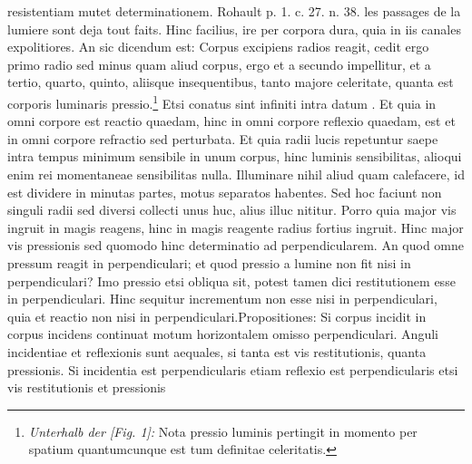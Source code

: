 resistentiam mutet determinationem. \pend \pstart Rohault\protect{} p. 1. c. 27. n. 38. les passages de la lumiere sont deja tout faits. Hinc facilius, ire per corpora dura, quia in iis canales expolitiores. An sic dicendum est: \pend \pstart Corpus excipiens radios reagit, cedit ergo primo radio sed minus quam aliud corpus, ergo et a secundo impellitur, et a tertio, quarto, quinto, aliisque insequentibus, tanto majore celeritate\protect{}, quanta est corporis luminaris pressio.\footnote{\textit{Unterhalb der [Fig. 1]:} Nota pressio luminis pertingit in momento per spatium quantumcunque est tum definitae celeritatis\protect{}. } Etsi conatus sint infiniti intra datum . Et quia in omni corpore est reactio quaedam, hinc in omni corpore reflexio\protect{} quaedam, est et in omni corpore refractio\protect{} sed perturbata. Et quia radii lucis repetuntur saepe intra tempus minimum sensibile in unum corpus, hinc luminis sensibilitas, alioqui enim rei momentaneae sensibilitas nulla. Illuminare nihil aliud quam calefacere, id est dividere in minutas partes, motus separatos habentes. Sed hoc faciunt non singuli radii sed diversi collecti unus huc, alius illuc nititur. \pend \pstart Porro quia major vis ingruit in magis reagens, hinc in magis reagente radius fortius ingruit. Hinc major vis pressionis sed quomodo hinc determinatio ad perpendicularem. An quod omne pressum reagit in perpendiculari; et quod pressio a lumine non fit nisi in perpendiculari? Imo pressio etsi obliqua sit, potest tamen dici restitutionem esse in perpendiculari. Hinc sequitur incrementum non esse nisi in perpendiculari, quia et reactio non nisi in perpendiculari.\pend \pstart Propositiones: Si corpus incidit in corpus  incidens continuat motum horizontalem omisso perpendiculari.  Anguli incidentiae\protect{} et reflexionis\protect{} sunt aequales, si tanta est vis restitutionis, quanta pressionis. Si incidentia est perpendicularis etiam reflexio\protect{} est perpendicularis etsi vis restitutionis et pressionis 